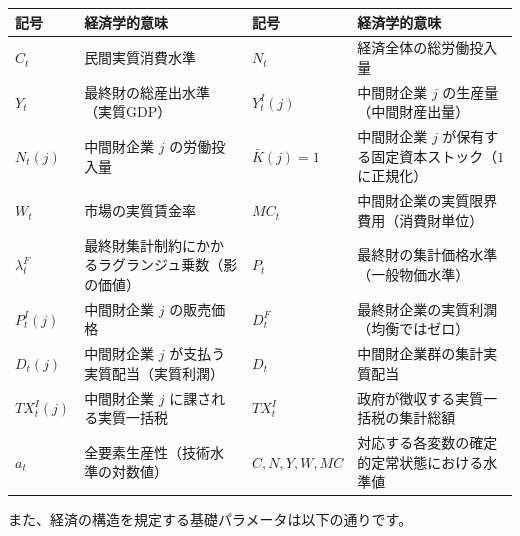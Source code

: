 \documentclass[
  japanese,
  lualatex,
  ja=standard,
  12pt,
  a4paper]{ltjsarticle}
\newcounter{none} %
\begin{document}
{\def\LTcaptype{none} %
\begin{longtable}[]{@{}
  >{\raggedright\arraybackslash}p{}
  >{\raggedright\arraybackslash}p{}
  >{\raggedright\arraybackslash}p{}
  >{\raggedright\arraybackslash}p{}@{}}
\toprule\noalign{}
\begin{minipage}[b]{\linewidth}\raggedright
記号
\end{minipage} & \begin{minipage}[b]{\linewidth}\raggedright
経済学的意味
\end{minipage} & \begin{minipage}[b]{\linewidth}\raggedright
記号
\end{minipage} & \begin{minipage}[b]{\linewidth}\raggedright
経済学的意味
\end{minipage} \\
\midrule\noalign{}
\endhead
\bottomrule\noalign{}
\endlastfoot
\(C_t\) & 民間実質消費水準 & \(N_t\) & 経済全体の総労働投入量 \\
\(Y_t\) & 最終財の総産出水準（実質GDP） & \(Y_t^I(j)\) & 中間財企業
\(j\) の生産量（中間財産出量） \\
\(N_t(j)\) & 中間財企業 \(j\) の労働投入量 & \(\bar{K}(j)=1\) &
中間財企業 \(j\) が保有する固定資本ストック（\(1\) に正規化） \\
\(W_t\) & 市場の実質賃金率 & \(MC_t\) &
中間財企業の実質限界費用（消費財単位） \\
\(\lambda_t^F\) & 最終財集計制約にかかるラグランジュ乗数（影の価値） &
\(P_t\) & 最終財の集計価格水準（一般物価水準） \\
\(P_t^I(j)\) & 中間財企業 \(j\) の販売価格 & \(D_t^F\) &
最終財企業の実質利潤（均衡ではゼロ） \\
\(D_t(j)\) & 中間財企業 \(j\) が支払う実質配当（実質利潤） & \(D_t\) &
中間財企業群の集計実質配当 \\
\(TX_t^I(j)\) & 中間財企業 \(j\) に課される実質一括税 & \(TX_t^I\) &
政府が徴収する実質一括税の集計総額 \\
\(a_t\) & 全要素生産性（技術水準の対数値） & \(C, N, Y, W, MC\) &
対応する各変数の確定的定常状態における水準値 \\
\end{longtable}
}

また、経済の構造を規定する基礎パラメータは以下の通りです。
\end{document}
